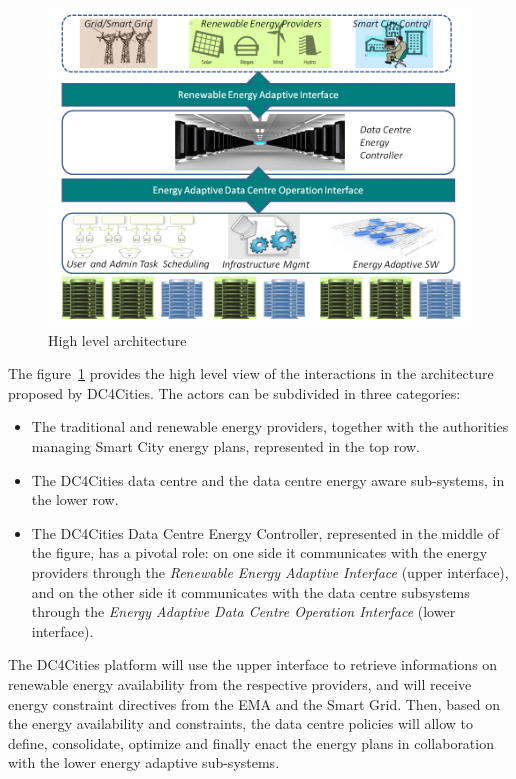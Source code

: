 \documentclass[conference]{IEEEtran}
\begin{document}
\begin{figure}[h]
  \centering
  \includegraphics[width=0.99\linewidth]{figs/highlevel}
  \caption{High level architecture}
  \label{fig:architecture}
\end{figure}

The figure~\ref{fig:architecture} provides the high level view of the interactions in the architecture proposed by DC4Cities. The actors can be subdivided in three categories: 
\begin{itemize}
  \item The traditional and renewable energy providers, together with the authorities managing Smart City energy plans, represented in the top row.
  \item The DC4Cities data centre and the data centre energy aware sub-systems, in the lower row.
  \item The DC4Cities Data Centre Energy Controller, represented in the middle of the figure, has a pivotal role: on one side it communicates with the energy providers through the \emph{Renewable Energy Adaptive Interface} (upper interface), and on the other side it communicates with the data centre subsystems through the \emph{Energy Adaptive Data Centre Operation Interface} (lower interface). 
\end{itemize}
The DC4Cities platform will use the upper interface to retrieve informations on renewable energy availability from the respective providers, and will receive energy constraint directives from the EMA and the Smart Grid.
Then, based on the energy availability and constraints, the data centre policies will allow to define, consolidate, optimize and finally enact the energy plans in collaboration with the lower energy adaptive sub-systems. 
\end{document}
